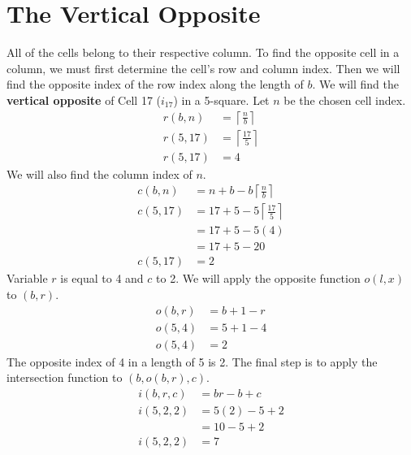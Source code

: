 \documentclass[letterpaper, twoside,12pt]{book}
\begin{document}
    \section{The Vertical Opposite} \label{vertical_opposite}
    All of the cells belong to their respective column. To find the opposite cell in a column, we must first determine the cell's row and column index. Then we will find the opposite index of the row index along the length of $b$. We will find the \textbf{vertical opposite} of Cell 17 ($i_{17}$) in a 5-square. Let $n$ be the chosen cell index.
    \begin{equation}
        \begin{split}
            r(b,n) &= \left\lceil \frac{n}{b}\right\rceil \\
            r(5,17) &= \left\lceil \frac{17}{5}\right\rceil \\
            r(5,17) &= 4
        \end{split}
    \end{equation}
    We will also find the column index of $n$.
    \begin{equation}
        \begin{split}
            c(b,n) &= n + b - b\left\lceil \frac{n}{b}\right\rceil \\
            c(5,17) &= 17 + 5 - 5\left\lceil \frac{17}{5}\right\rceil \\
                &= 17 + 5 - 5(4) \\
                &= 17 + 5 - 20 \\
            c(5,17) &= 2
        \end{split}
    \end{equation}
    Variable $r$ is equal to 4 and $c$ to 2. We will apply the opposite function $o(l,x)$ to $(b,r)$.
    \begin{equation}
        \begin{split}
            o(b,r) &= b + 1 - r \\
            o(5,4) &= 5 + 1 - 4 \\
            o(5,4) &= 2
        \end{split}
    \end{equation}
    The opposite index of 4 in a length of 5 is 2. The final step is to apply the intersection function to $(b,o(b,r),c)$.
    \begin{equation}
        \begin{split}
            i(b,r,c) &= br - b + c \\
            i(5,2,2) &= 5(2) - 5 + 2 \\
                &= 10 - 5 + 2 \\
            i(5,2,2) &= 7 \\
        \end{split}
    \end{equation}
\end{document}
